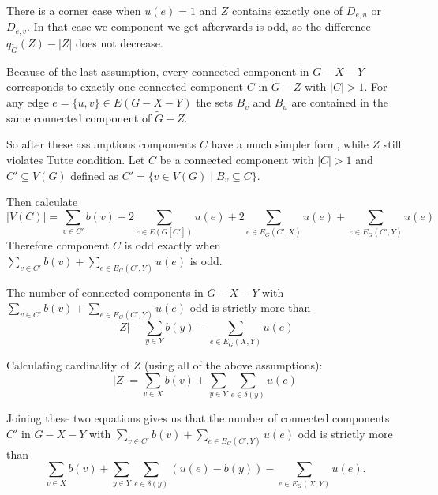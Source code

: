 \begin{exercise}{3}
\begin{itemize}
{            There is a corner case when $u(e) = 1$ and $Z$ contains exactly one
            of $D_{e, u}$ or $D_{e, v}$. In that case we component we get
            afterwards is odd, so the difference $q_{\tilde{G}}(Z) - |Z|$
            does not decrease.}

    \end{itemize}

    Because of the last assumption, every connected component in $G - X - Y$
    corresponds to exactly one connected component $C$ in $\tilde{G} - Z$ with
    $|C| > 1$. For any edge $e = \{u, v\} \in E(G - X - Y)$ the sets $B_v$
    and $B_u$ are contained in the same connected component of $\tilde{G} - Z$.

    So after these assumptions components $C$ have a much simpler form, while
    $Z$ still violates Tutte condition. Let $C$ be a connected component with
    $|C| > 1$ and $C' \subseteq V(G)$ defined as $C' = \{ v \in V(G) \mid B_v
    \subseteq C \}$.

    Then calculate
    \begin{equation*}
        |V(C)| = \sum_{v \in C'} b(v) + 2 \sum_{e \in E(G[C'])} u(e) + 2 \sum_{e
        \in E_G(C', X)} u(e) + \sum_{e \in E_G(C', Y)} u(e)
    \end{equation*}
    Therefore component $C$ is odd exactly when $\sum_{v \in C'} b(v) + \sum_{e
    \in E_G(C', Y)} u(e)$ is odd.


    The number of connected components in $G - X - Y$ with $\sum_{v \in C'} b(v)
    + \sum_{e \in E_G(C', Y)} u(e)$ odd is strictly more than
    \begin{equation*}
        |Z| - \sum_{y \in Y} b(y) - \sum_{e \in E_G(X, Y)} u(e)
    \end{equation*}

    Calculating cardinality of $Z$ (using all of the above assumptions):
    \begin{equation*}
        |Z| = \sum_{v \in X} b(v) + \sum_{y \in Y} \sum_{e \in \delta(y)} u(e)
    \end{equation*}

    Joining these two equations gives us that the number of connected components
    $C'$ in $G - X - Y$ with $\sum_{v \in C'} b(v) + \sum_{e \in E_G(C', Y)} u(e)$
    odd is strictly more than
    \begin{equation*}
        \sum_{v \in X} b(v) + \sum_{y \in Y} \sum_{e \in \delta(y)} (u(e) -
        b(y)) - \sum_{e \in E_G(X, Y)} u(e).
    \end{equation*}


\end{exercise}
